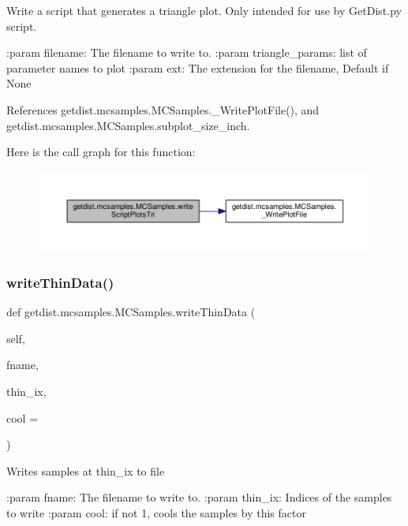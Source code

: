 \begin{DoxyVerb}Write a script that generates a triangle plot. Only intended for use by GetDist.py script.

:param filename: The filename to write to.
:param triangle_params: list of parameter names to plot
:param ext: The extension for the filename, Default if None
\end{DoxyVerb}
 

References getdist.\+mcsamples.\+M\+C\+Samples.\+\_\+\+Write\+Plot\+File(), and getdist.\+mcsamples.\+M\+C\+Samples.\+subplot\+\_\+size\+\_\+inch.

Here is the call graph for this function\+:
\nopagebreak
\begin{figure}[H]
\begin{center}
\leavevmode
\includegraphics[width=350pt]{classgetdist_1_1mcsamples_1_1MCSamples_a13bcb199afa7e06273aee1b088532078_cgraph}
\end{center}
\end{figure}
\mbox{\label{classgetdist_1_1mcsamples_1_1MCSamples_a54d3885a66251e46d1d478342dec866e}} 
\subsubsection{\texorpdfstring{write\+Thin\+Data()}{writeThinData()}}
{\footnotesize\ttfamily def getdist.\+mcsamples.\+M\+C\+Samples.\+write\+Thin\+Data (\begin{DoxyParamCaption}\item[{}]{self,  }\item[{}]{fname,  }\item[{}]{thin\+\_\+ix,  }\item[{}]{cool = {} }\end{DoxyParamCaption})}

\begin{DoxyVerb}Writes samples at thin_ix to file

:param fname: The filename to write to.
:param thin_ix: Indices of the samples to write
:param cool: if not 1, cools the samples by this factor
\end{DoxyVerb}
 

